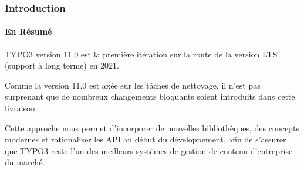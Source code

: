 %

\begin{frame}[fragile]
	\frametitle{Introduction}
	\framesubtitle{En Résumé}

	\small
		TYPO3 version 11.0 est la première itération sur la route de la version LTS
		(support à long terme) en 2021.

		\vspace{0.2cm}

		Comme la version 11.0 est axée sur les tâches de nettoyage, il n'est pas
		surprenant que de nombreux changements bloquants soient introduits dans cette livraison.

		\vspace{0.2cm}

		Cette approche nous permet d'incorporer de nouvelles bibliothèques, des concepts
		modernes et rationaliser les API au début du développement, afin de s'assurer que
		TYPO3 reste l'un des meilleurs systèmes de gestion de contenu d'entreprise du marché.

		\vspace{0.2cm}

	\normalsize

\end{frame}

